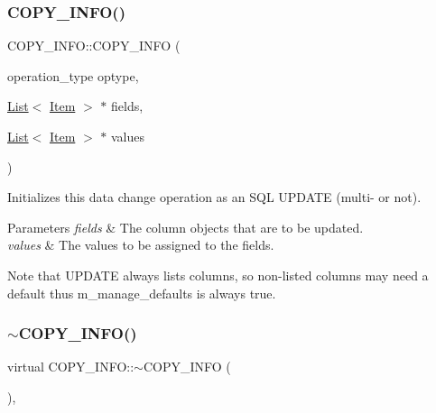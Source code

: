 \subsubsection{\texorpdfstring{C\+O\+P\+Y\+\_\+\+I\+N\+F\+O()}{COPY\_INFO()}\hspace{0.1cm}{\footnotesize\ttfamily [3/3]}}
{\footnotesize\ttfamily C\+O\+P\+Y\+\_\+\+I\+N\+F\+O\+::\+C\+O\+P\+Y\+\_\+\+I\+N\+FO (\begin{DoxyParamCaption}\item[{operation\+\_\+type}]{optype,  }\item[{\mbox{\hyperlink{classList}{List}}$<$ \mbox{\hyperlink{classItem}{Item}} $>$ $\ast$}]{fields,  }\item[{\mbox{\hyperlink{classList}{List}}$<$ \mbox{\hyperlink{classItem}{Item}} $>$ $\ast$}]{values }\end{DoxyParamCaption})\hspace{0.3cm}{\ttfamily [inline]}}

Initializes this data change operation as an S\+QL {\ttfamily U\+P\+D\+A\+TE} (multi-\/ or not).


\begin{DoxyParams}{Parameters}
{\em fields} & The column objects that are to be updated. \\
\hline
{\em values} & The values to be assigned to the fields. \\
\hline
\end{DoxyParams}
\begin{DoxyNote}{Note}
that U\+P\+D\+A\+TE always lists columns, so non-\/listed columns may need a default thus m\+\_\+manage\+\_\+defaults is always true. 
\end{DoxyNote}
\mbox{\label{classCOPY__INFO_a0489e263f2e297822a61946ea98a9dc4}} 
\subsubsection{\texorpdfstring{$\sim$\+C\+O\+P\+Y\+\_\+\+I\+N\+F\+O()}{~COPY\_INFO()}}
{\footnotesize\ttfamily virtual C\+O\+P\+Y\+\_\+\+I\+N\+F\+O\+::$\sim$\+C\+O\+P\+Y\+\_\+\+I\+N\+FO (\begin{DoxyParamCaption}{ }\end{DoxyParamCaption})\hspace{0.3cm}{\ttfamily [inline]}, {\ttfamily [virtual]}}

